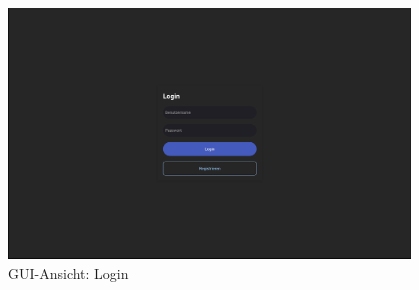 \begin{figure}[H]
    \centering
    \includegraphics[width=0.95\textwidth]{src/mockup_ui_login.png}
    \caption{GUI-Ansicht: Login}
    \label{fig:gui-login}
\end{figure}
